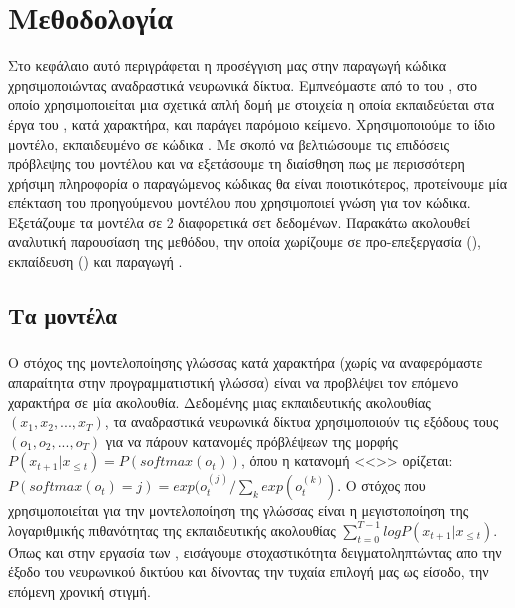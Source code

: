 \chapter{Μεθοδολογία}
Στο κεφάλαιο αυτό περιγράφεται η προσέγγιση μας στην παραγωγή κώδικα χρησιμοποιώντας αναδραστικά νευρωνικά δίκτυα.
Εμπνεόμαστε από το  του , στο οποίο χρησιμοποιείται μια σχετικά απλή δομή  με  στοιχεία η οποία εκπαιδεύεται στα έργα του , κατά χαρακτήρα, και παράγει παρόμοιο κείμενο.
Χρησιμοποιούμε το ίδιο μοντέλο, εκπαιδευμένο σε κώδικα .
Με σκοπό να βελτιώσουμε τις επιδόσεις πρόβλεψης του μοντέλου και να εξετάσουμε τη διαίσθηση πως με περισσότερη χρήσιμη πληροφορία ο παραγώμενος κώδικας θα είναι ποιοτικότερος, προτείνουμε μία επέκταση του προηγούμενου μοντέλου που χρησιμοποιεί  γνώση για τον κώδικα.
Εξετάζουμε τα μοντέλα σε 2 διαφορετικά σετ δεδομένων.
Παρακάτω ακολουθεί αναλυτική παρουσίαση της μεθόδου, την οποία χωρίζουμε σε προ-επεξεργασία (), εκπαίδευση () και παραγωγή .

\section{Τα μοντέλα}

\subsection{}
Ο στόχος της μοντελοποίησης γλώσσας κατά χαρακτήρα (χωρίς να αναφερόμαστε απαραίτητα στην προγραμματιστική γλώσσα) είναι να προβλέψει τον επόμενο χαρακτήρα σε μία ακολουθία.
Δεδομένης μιας εκπαιδευτικής ακολουθίας $(x_1, x_2, ..., x_T)$, τα αναδραστικά νευρωνικά δίκτυα χρησιμοποιούν τις εξόδους τους $(ο_1, ο_2, ..., ο_T)$ για να πάρουν κατανομές πρόβλέψεων της μορφής $P(x_{t+1}|x_{\leq{t}}) = P(softmax(o_t))$, όπου η κατανομή <<>> ορίζεται: $P(softmax(o_t) = j) = exp(o_t^{(j)}/\sum_k exp(o_t^{(k)})$.
Ο στόχος που χρησιμοποιείται για την μοντελοποίηση της γλώσσας είναι η μεγιστοποίηση της λογαριθμικής πιθανότητας της εκπαιδευτικής ακολουθίας $\sum_{t=0}^{T-1}logP(x_{t+1}|x_{\leq{t}})$.
Όπως και στην εργασία των  \cite{Graves2013}, εισάγουμε στοχαστικότητα δειγματοληπτώντας απο την έξοδο του νευρωνικού δικτύου και δίνοντας την τυχαία επιλογή μας ως είσοδο, την επόμενη χρονική στιγμή.

\subsection{}

